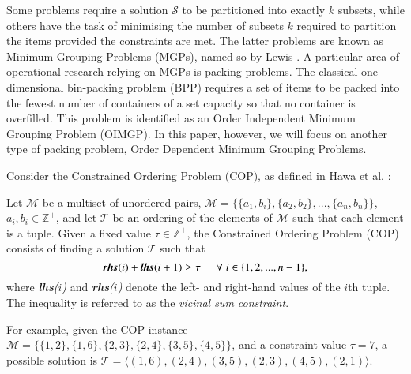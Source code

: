 \documentclass{elsarticle}
\begin{document}
\noindent Some problems require a solution $\mathcal{S}$ to be partitioned into exactly $k$ subsets, while others have the task of minimising the number of subsets $k$ required to partition the items provided the constraints are met. The latter problems are known as Minimum Grouping Problems (MGPs), named so by Lewis \cite{lewis2009}. A particular area of operational research relying on MGPs is packing problems. The classical one-dimensional bin-packing problem (BPP) requires a set of items to be packed into the fewest number of containers of a set capacity so that no container is overfilled. This problem is identified as an Order Independent Minimum Grouping Problem (OIMGP). In this paper, however, we will focus on another type of packing problem, Order Dependent Minimum Grouping Problems.

Consider the Constrained Ordering Problem (COP), as defined in Hawa et al. \cite{hawa2018}:
\begin{definition}
	\label{defn:cop}
	Let $\mathcal{M}$ be a multiset of unordered pairs, $\mathcal{M} = \{\{a_1, b_i\}, \{a_2, b_2\},..., \{a_n, b_n\}\}$, $a_i, b_i \in \mathbb{Z}^+$, and let $\mathcal{T}$ be an ordering of the elements of $\mathcal{M}$ such that each element is a tuple. Given a fixed value $\tau \in \mathbb{Z}^+$, the Constrained Ordering Problem (COP) consists of finding a solution $\mathcal{T}$ such that
	\begin{equation}
	\label{eqn:vsc}
	\emph{\textbf{rhs}}(i) + \emph{\textbf{lhs}}(i+1) \geq \tau \hspace{5mm} \forall \hspace{1mm} i \in \{1,2,..., n-1\},
	\end{equation}
	where \emph{\textbf{lhs}($i$)} and \emph{\textbf{rhs}($i$)} denote the left- and right-hand values of the $i$th tuple. The inequality is referred to as the \emph{vicinal sum constraint}.
\end{definition}

For example, given the COP instance $\mathcal{M} = \{\{1,2\}, \{1,6\}, \{2,3\}, \{2,4\}, \{3,5\}, \{4,5\}\}$, and a constraint value $\tau = 7$, a possible solution is $\mathcal{T} = \langle(1,6), (2,4), (3,5), (2,3), (4,5), (2,1)\rangle$. 
\end{document}
